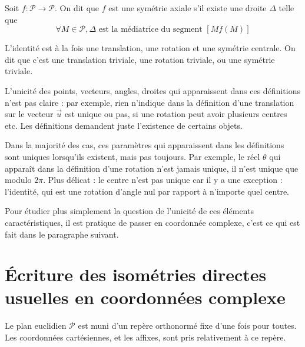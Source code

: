 \begin{definition}
Soit $f : \mathcal P\to \mathcal P$. On dit que $f$ est une symétrie axiale s'il existe une droite $\Delta$ telle que
\[ \forall M\in\mathcal P, \Delta \text{ est la médiatrice du segment } [Mf(M)]\]
\end{definition}

\begin{remarque}
L'identité est à la fois une translation, une rotation et une symétrie centrale. On dit que c'est une translation triviale, une rotation triviale, ou une symétrie triviale.
\end{remarque}



L'unicité des points, vecteurs, angles, droites qui apparaissent dans ces définitions n'est pas claire : par exemple, rien n'indique dans la définition d'une translation sur le vecteur $\vec u$ est unique ou pas, si une rotation peut avoir plusieurs centres etc. Les définitions demandent juste l'existence de certains objets.

Dans la majorité des cas, ces paramètres qui apparaissent dans les définitions sont uniques lorsqu'ils existent, mais pas toujours. Par exemple, le réel $\theta$ qui apparaît dans la définition d'une rotation n'est jamais unique, il n'est unique que modulo $2\pi$. Plus délicat : le centre n'est pas unique car il y a une exception : l'identité, qui est une rotation d'angle nul par rapport à n'importe quel \og centre\fg. 

Pour étudier plus simplement la question de l'unicité de ces \og éléments caractéristiques\fg, il est pratique de passer en coordonnée complexe, c'est ce qui est fait dans le paragraphe suivant.

\section{Écriture des isométries directes usuelles en coordonnées complexe}

Le plan euclidien $\mathcal P$ est muni d'un repère orthonormé fixe d'une fois pour toutes. Les coordonnées cartésiennes, et les affixes, sont pris relativement à ce repère.


